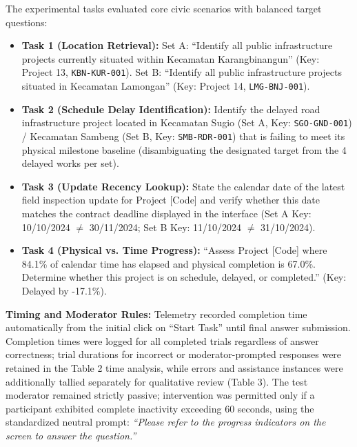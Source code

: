 \documentclass[runningheads]{llncs}
\newcommand{\hl}[1]{#1}
\begin{document}
The experimental tasks evaluated core civic scenarios with balanced target questions:
\begin{itemize}\setlength{\itemsep}{1.2pt}\setlength{\parskip}{0pt}
    \item \textbf{Task 1 (Location Retrieval):} Set A: ``Identify all public infrastructure projects currently situated within Kecamatan Karangbinangun'' (Key: Project 13, \texttt{KBN-KUR-001}). Set B: ``Identify all public infrastructure projects situated in Kecamatan Lamongan'' (Key: Project 14, \texttt{LMG-BNJ-001}).
    \item \textbf{Task 2 (Schedule Delay Identification):} \hl{Identify the delayed road infrastructure project located in Kecamatan Sugio (Set A, Key: \texttt{SGO-GND-001}) / Kecamatan Sambeng (Set B, Key: \texttt{SMB-RDR-001}) that is failing to meet its physical milestone baseline (disambiguating the designated target from the 4 delayed works per set).}
    \item \textbf{Task 3 (Update Recency Lookup):} \hl{State the calendar date of the latest field inspection update for Project [Code] and verify whether this date matches the contract deadline displayed in the interface (Set A Key: 10/10/2024 $\neq$ 30/11/2024; Set B Key: 11/10/2024 $\neq$ 31/10/2024).}
    \item \textbf{Task 4 (Physical vs. Time Progress):} ``Assess Project [Code] where 84.1\% of calendar time has elapsed and physical completion is 67.0\%. Determine whether this project is on schedule, delayed, or completed.'' (Key: Delayed by -17.1\%).
\end{itemize}

\textbf{Timing and Moderator Rules:} Telemetry recorded completion time automatically from the initial click on ``Start Task'' until final answer submission. Completion times were logged for all completed trials regardless of answer correctness; trial durations for incorrect or moderator-prompted responses were retained in the Table 2 time analysis, while errors and assistance instances were additionally tallied separately for qualitative review (Table 3). The test moderator remained strictly passive; intervention was permitted only if a participant exhibited complete inactivity exceeding 60 seconds, using the standardized neutral prompt: \emph{``Please refer to the progress indicators on the screen to answer the question.''}
\end{document}
